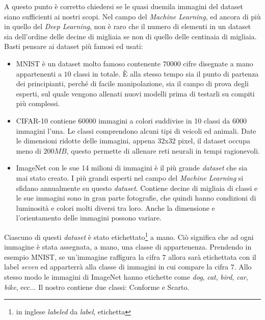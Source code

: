 A questo punto è corretto chiedersi se le quasi duemila immagini del dataset siano sufficienti ai nostri scopi.
Nel campo del \textit{Machine Learning}, ed ancora di più in quello del \textit{Deep Learning}, non è raro che il numero di elementi in un dataset sia dell'ordine delle decine di migliaia se non di quello delle centinaia di migliaia.
Basti pensare ai dataset più famosi ed usati:
\begin{itemize}
  \item MNIST è un dataset molto famoso contenente $70000$ cifre disegnate a mano appartenenti a $10$ classi in totale.
    È alla stesso tempo sia il punto di partenza dei principianti, perché di facile manipolazione, sia il campo di prova degli esperti, sul quale vengono allenati nuovi modelli prima di testarli su compiti più complessi.

  \item CIFAR-10 contiene $60000$ immagini a colori suddivise in 10 classi da 6000 immagini l'una.
    Le classi comprendono alcuni tipi di veicoli ed animali.
   Date le dimensioni ridotte delle immagini, appena $32$x$32$ pixel, il dataset occupa meno di $200 MB$, questo permette di allenare reti neurali in tempi ragionevoli.

 \item ImageNet con le sue 14 milioni di immagini è il più grande \textit{dataset} che sia mai stato creato.
    I più grandi esperti nel campo del \textit{Machine Learning} si sfidano annualmente su questo \textit{dataset}.
    Contiene decine di migliaia di classi e le sue immagini sono in gran parte fotografie, che quindi hanno condizioni di luminosità e colori molti diversi tra loro.
    Anche la dimensione e l'orientamento delle immagini possono variare.

\end{itemize}

Ciascuno di questi \textit{dataset} è stato etichettato\footnote{in inglese \textit{labeled} da \textit{label}, etichetta} a mano.
Ciò significa che ad ogni immagine è stata assegnata, a mano, una classe di appartenenza.
Prendendo in esempio MNIST, se un'immagine raffigura la cifra $7$ allora sarà etichettata con il label \textit{seven} ed apparterrà alla classe di immagini in cui compare la cifra $7$.
Allo stesso modo le immagini di ImageNet hanno etichette come \textit{dog}, \textit{cat}, \textit{bird}, \textit{car}, \textit{bike}, ecc... %
Il nostro contiene due classi: Conforme e Scarto.

